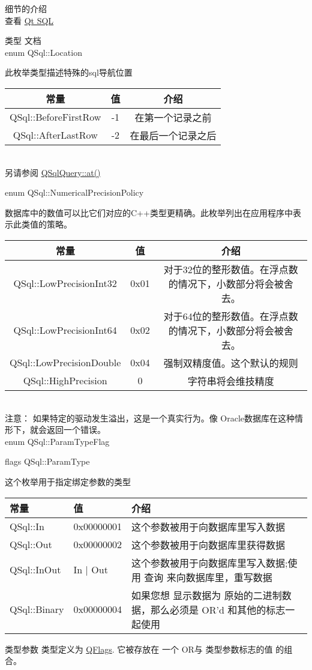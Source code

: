 细节的介绍 \\

查看 \href{https://doc.qt.io/qt-5/qtsql-index.html}{Qt SQL}

类型 文档\\ 

enum QSql::Location


此枚举类型描述特殊的sql导航位置


\begin{tabular}{|c|c|c|}
	\hline
	常量	& 值 & 介绍 \\
	\hline
	QSql::BeforeFirstRow&-1&在第一个记录之前\\
	\hline
	QSql::AfterLastRow&-2&在最后一个记录之后\\
	\hline
\end{tabular}\\

另请参阅 \href{https://doc.qt.io/qt-5/qsqlquery.html#at}{QSqlQuery::at()}

enum QSql::NumericalPrecisionPolicy


数据库中的数值可以比它们对应的C++类型更精确。此枚举列出在应用程序中表示此类值的策略。


\begin{tabular}{|c|c|c|}
	\hline
	常量	& 值 & 介绍 \\
	\hline
	QSql::LowPrecisionInt32	&0x01 &对于32位的整形数值。在浮点数的情况下，小数部分将会被舍去。\\
	\hline
	QSql::LowPrecisionInt64	&0x02 &对于64位的整形数值。在浮点数的情况下，小数部分将会被舍去。\\
	\hline
	QSql::LowPrecisionDouble&0x04 &强制双精度值。这个默认的规则\\
	\hline
	QSql::HighPrecision	&0&字符串将会维技精度\\
	\hline
\end{tabular}\\

注意： 如果特定的驱动发生溢出，这是一个真实行为。像 Oracle数据库在这种情形下，就会返回一个错误。\\


enum QSql::ParamTypeFlag


flags QSql::ParamType


这个枚举用于指定绑定参数的类型

\begin{tabular}{|l|l|l|}
	\hline
	常量	& 值 & 介绍 \\
	\hline
	QSql::In&0x00000001&这个参数被用于向数据库里写入数据\\
	\hline
	QSql::Out&0x00000002&这个参数被用于向数据库里获得数据\\
	\hline
	QSql::InOut&In | Out&这个参数被用于向数据库里写入数据;使用 查询 来向数据库里，重写数据\\
	\hline
	QSql::Binary&0x00000004&如果您想 显示数据为 原始的二进制数据，那么必须是 OR'd 和其他的标志一 起使用\\
	\hline
\end{tabular}

类型参数 类型定义为 \href{https://doc.qt.io/qt-5/qflags.html}{QFlags}. 它被存放在 一个 OR与 类型参数标志的值 的组合。





